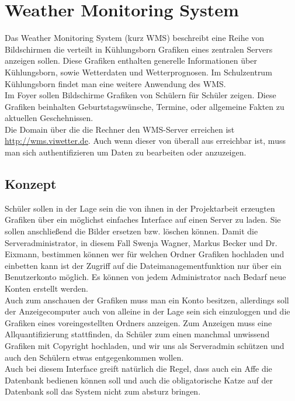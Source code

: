 \documentclass[a4paper,oneside,12pt,titlepage]{article}
\newcommand{\link}[1]{\textcolor{link}{\url{#1}}}	%
\begin{document}
\section{Weather Monitoring System}
Das Weather Monitoring System (kurz WMS) beschreibt eine Reihe von Bildschirmen die verteilt in Kühlungsborn Grafiken eines zentralen Servers anzeigen sollen. Diese Grafiken enthalten generelle Informationen über Kühlungsborn, sowie Wetterdaten und Wetterprognosen. Im Schulzentrum Kühlungsborn findet man eine weitere Anwendung des WMS. \\
Im Foyer sollen Bildschirme Grafiken von Schülern für Schüler zeigen. Diese Grafiken beinhalten Geburtstagswünsche, Termine, oder allgemeine Fakten zu aktuellen Geschehnissen. \\
Die Domain über die die Rechner den WMS-Server erreichen ist \link{http://wms.viwetter.de}. Auch wenn dieser von überall aus erreichbar ist, muss man sich authentifizieren um Daten zu bearbeiten oder anzuzeigen.

\subsection{Konzept} %
Schüler sollen in der Lage sein die von ihnen in der Projektarbeit erzeugten Grafiken über ein möglichst einfaches Interface auf einen Server zu laden. Sie sollen anschließend die Bilder ersetzen bzw. löschen können. Damit die Serveradministrator, in diesem Fall Swenja Wagner, Markus Becker und Dr. Eixmann, bestimmen können wer für welchen Ordner Grafiken hochladen und einbetten kann ist der Zugriff auf die Dateimanagementfunktion nur über ein Benutzerkonto möglich. Es können von jedem Administrator nach Bedarf neue Konten erstellt werden. \\
Auch zum anschauen der Grafiken muss man ein Konto besitzen, allerdings soll der Anzeigecomputer auch von alleine in der Lage sein sich einzuloggen und die Grafiken eines voreingestellten Ordners anzeigen. Zum Anzeigen muss eine Allquantifizierung stattfinden, da Schüler zum einen manchmal unwissend Grafiken mit Copyright hochladen, und wir uns als Serveradmin schützen und auch den Schülern etwas entgegenkommen wollen. \\
Auch bei diesem Interface greift natürlich die Regel, dass auch ein Affe die Datenbank bedienen können soll und auch die obligatorische Katze auf der Datenbank soll das System nicht zum absturz bringen.
\end{document}

